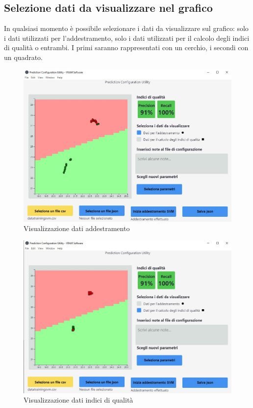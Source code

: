 	\subsection{Selezione dati da visualizzare nel grafico}
	In qualsiasi momento è possibile selezionare i dati da visualizzare sul grafico: solo i dati utilizzati per l'addestramento, solo i dati utilizzati per il calcolo degli indici di qualità o entrambi. I primi saranno rappresentati con un cerchio, i secondi con un quadrato.
	\begin{figure}[H] 	
		\begin{center}
			\includegraphics[width=\linewidth]{img/6.jpg}
		\end{center}
		\caption{Visualizzazione dati addestramento}	
	\end{figure}
	\begin{figure}[H] 	
		\begin{center}
			\includegraphics[width=\linewidth]{img/8.jpg}
		\end{center}
		\caption{Visualizzazione dati indici di qualità}	
	\end{figure}

